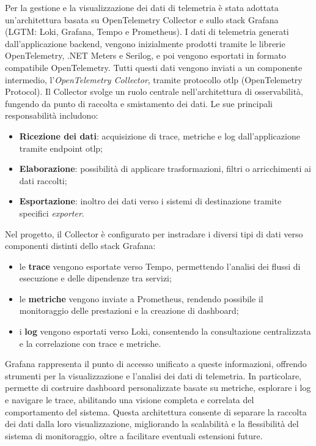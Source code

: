 Per la gestione e la visualizzazione dei dati di telemetria è stata adottata un’architettura basata su OpenTelemetry Collector e sullo stack Grafana (LGTM: Loki, Grafana, Tempo e Prometheus).
I dati di telemetria generati dall’applicazione backend, vengono inizialmente prodotti tramite le librerie OpenTelemetry, .NET Meters e Serilog, e poi vengono esportati in formato compatibile OpenTelemetry.
Tutti questi dati vengono inviati a un componente intermedio, l’\textit{OpenTelemetry Collector}, tramite protocollo \gls{otlp} (OpenTelemetry Protocol). Il Collector svolge un ruolo centrale nell’architettura di osservabilità, fungendo da punto di raccolta e smistamento dei dati. Le sue principali responsabilità includono:
\begin{itemize}
      \item \textbf{Ricezione dei dati}: acquisizione di trace, metriche e log dall’applicazione tramite endpoint \gls{otlp};
      \item \textbf{Elaborazione}: possibilità di applicare trasformazioni, filtri o arricchimenti ai dati raccolti;
      \item \textbf{Esportazione}: inoltro dei dati verso i sistemi di destinazione tramite specifici \textit{exporter}.
\end{itemize}
Nel progetto, il Collector è configurato per instradare i diversi tipi di dati verso componenti distinti dello stack Grafana:
\begin{itemize}
      \item le \textbf{trace} vengono esportate verso Tempo, permettendo l’analisi dei flussi di esecuzione e delle dipendenze tra servizi;
      \item le \textbf{metriche} vengono inviate a Prometheus, rendendo possibile il monitoraggio delle prestazioni e la creazione di dashboard;
      \item i \textbf{log} vengono esportati verso Loki, consentendo la consultazione centralizzata e la correlazione con trace e metriche.
\end{itemize}
Grafana rappresenta il punto di accesso unificato a queste informazioni, offrendo strumenti per la visualizzazione e l’analisi dei dati di telemetria. In particolare, permette di costruire dashboard personalizzate basate su metriche, esplorare i log e navigare le trace, abilitando una visione completa e correlata del comportamento del sistema.
Questa architettura consente di separare la raccolta dei dati dalla loro visualizzazione, migliorando la scalabilità e la flessibilità del sistema di monitoraggio, oltre a facilitare eventuali estensioni future.

